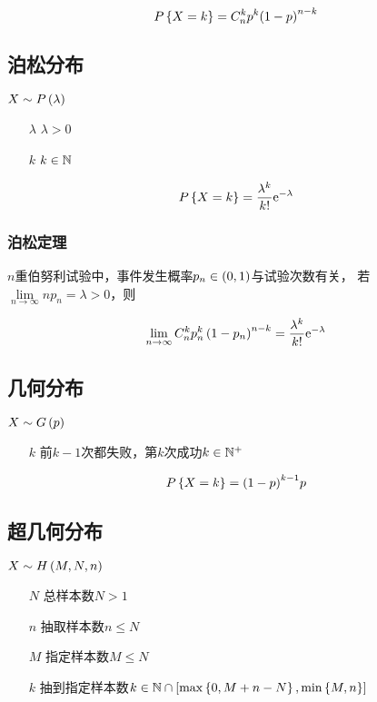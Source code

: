 \documentclass{article}
\begin{document}
\[P\left\{X=k\right\}=C_n^kp^k{\left(1-p\right)}^{n-k}\]

\subsection{泊松分布}

$X\sim P\left(\lambda\right)$

\begin{enumerate}
    \item [$\lambda$] $\lambda>0$
    \item [$k$] $k\in\mathbb N$
\end{enumerate}

\[P\left\{X=k\right\}=\frac{\lambda^k}{k!}\mathrm e^{-\lambda}\]

\subsubsection{泊松定理}

$n$重伯努利试验中，事件发生概率$p_n\in\left(0,1\right)$与试验次数有关，
若$\lim\limits_{n\to\infty}np_n=\lambda>0$，则

\[\lim_{n\to\infty}C_n^kp_n^k\left(1-p_n\right)^{n-k}
    =\dfrac{\lambda^k}{k!}\mathrm e^{-\lambda}\]

\subsection{几何分布}

$X\sim G\left(p\right)$

\begin{enumerate}
    \item [$k$] 前$k-1$次都失败，第$k$次成功$k\in\mathbb N^+$
\end{enumerate}

\[P\left\{X=k\right\}={\left(1-p\right)}^{k-1}p\]

\subsection{超几何分布}

$X\sim H\left(M,N,n\right)$

\begin{enumerate}
    \item [$N$] 总样本数$N>1$
    \item [$n$] 抽取样本数$n\leqslant N$
    \item [$M$] 指定样本数$M\leqslant N$
    \item [$k$] 抽到指定样本数$k\in\mathbb N\cap\left[\max\left\{0,M+n-N\right\},\min\left\{M,n\right\}\right]$
\end{enumerate}
\end{document}
